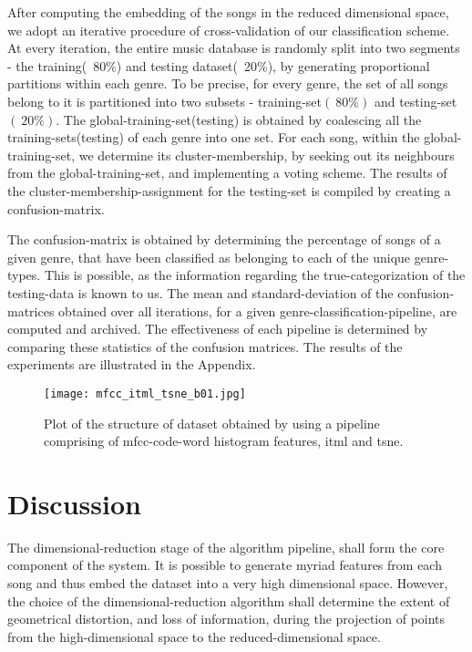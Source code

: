 \documentclass[10pt]{article}
\begin{document}
After computing the embedding of the songs in the reduced dimensional space, we adopt an iterative procedure of cross-validation of our classification scheme. At every iteration, the entire music database is randomly split into two segments - the training(~80\%) and testing dataset(~20\%), by generating proportional partitions within each genre.
To be precise, for every genre, the set of all songs belong to it is partitioned into two subsets - training-set$(~80\%)$ and testing-set$(~20\%)$. The global-training-set(testing) is obtained by coalescing all the training-sets(testing) of each genre into one set. For each song, within the global-training-set, we determine its cluster-membership, by seeking out its neighbours from the global-training-set, and implementing a voting scheme. The results of the cluster-membership-assignment for the testing-set is compiled by creating a confusion-matrix. 

The confusion-matrix is obtained by determining the percentage of songs of a given genre, that have been classified as belonging to each of the unique genre-types. This is possible, as the information regarding the true-categorization of the testing-data is known to us.   The mean and standard-deviation of the confusion-matrices obtained over all iterations, for a given genre-classification-pipeline, are computed and archived. The effectiveness of each pipeline is determined by comparing these statistics of the confusion matrices. The results of the experiments are illustrated in the Appendix. 


\begin{figure}[h!]
\centering
\texttt{[image: mfcc\_itml\_tsne\_b01.jpg]}\\
\caption{Plot of the structure of dataset obtained by using a pipeline comprising of mfcc-code-word histogram features, itml and tsne.}
\label{fig:mfccw_itml_tsne}
\end{figure}



\section{Discussion}

The dimensional-reduction stage of the algorithm pipeline, shall form the core component of the system. It is possible to generate myriad features from each song and thus embed the dataset into a very high dimensional space. However, the choice of the dimensional-reduction algorithm shall determine the extent of geometrical distortion, and loss of information, during the projection of points from the high-dimensional space to the reduced-dimensional space. 
\end{document}
